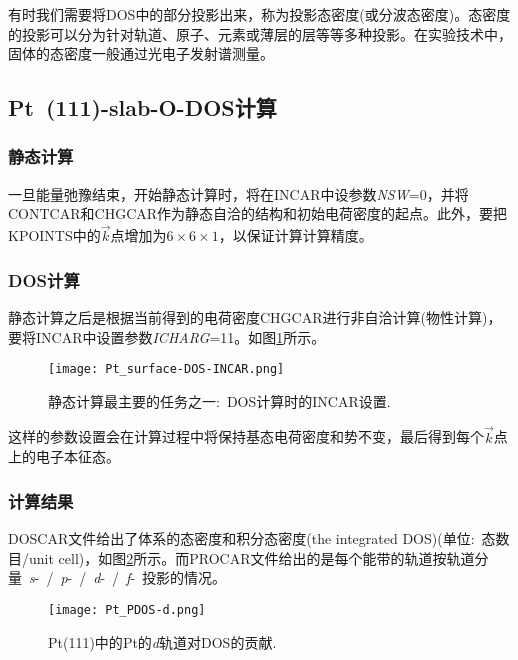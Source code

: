 有时我们需要将\textrm{DOS}中的部分投影出来，称为投影态密度(或分波态密度)。态密度的投影可以分为针对轨道、原子、元素或薄层的层等等多种投影。在实验技术中，固体的态密度一般通过光电子发射谱测量。
\subsection{Pt~(111)-slab-O-DOS计算}
\subsubsection{\rm{静态计算}}
一旦能量弛豫结束，开始静态计算时，将在\textrm{INCAR}中设参数\textit{NSW}=0，并将\textrm{CONTCAR}和\textrm{CHGCAR}作为静态自洽的结构和初始电荷密度的起点。此外，要把\textrm{KPOINTS}中的$\vec k$点增加为$6\times6\times1$，以保证计算计算精度。
\subsubsection{\rm{DOS}计算}
静态计算之后是根据当前得到的电荷密度\textrm{CHGCAR}进行非自洽计算(物性计算)，要将\textrm{INCAR}中设置参数\textit{ICHARG}=11。如图\ref{Pt_surface-DOS-INCAR}所示。
\begin{figure}[h!]
\centering
\texttt{[image: Pt\_surface-DOS-INCAR.png]}
\caption{\small \textrm{静态计算最主要的任务之一:~\textrm{DOS}计算时的\textrm{INCAR}设置.}}%
\label{Pt_surface-DOS-INCAR}
\end{figure}

这样的参数设置会在计算过程中将保持基态电荷密度和势不变，最后得到每个$\vec k$点上的电子本征态。
\subsubsection{\rm{计算结果}}
\textrm{DOSCAR}文件给出了体系的态密度和积分态密度\textrm{(the integrated DOS)}(单位:~态数目/\textrm{unit cell})，如图\ref{Pt_PDOS-d}所示。而\textrm{PROCAR}文件给出的是每个能带的轨道按轨道分量~\textit{s}-~/~\textit{p}-~/~\textit{d}-~/~\textit{f}-~投影的情况。
\begin{figure}[h!]
\centering
\texttt{[image: Pt\_PDOS-d.png]}
\caption{\small \textrm{\textrm{Pt(111)中的\textrm{Pt}的\textit{d}轨道对\textrm{DOS}的贡献}.}}%
\label{Pt_PDOS-d}
\end{figure}

